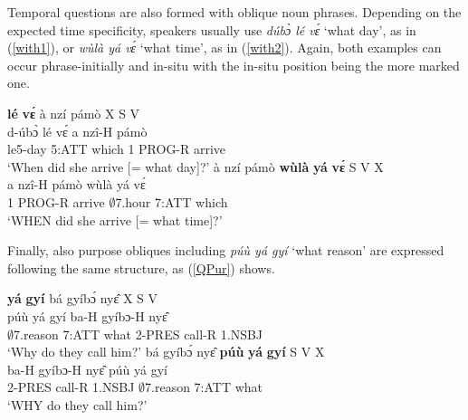 Temporal questions are also formed with oblique noun phrases. Depending on the expected time specificity, speakers usually use {\itshape dúbɔ̀ lé vɛ́} `what day', as in (\ref{with1}), or {\itshape wùlà yá vɛ́} `what time', as in (\ref{with2}). Again, both examples can occur phrase-initially and in-situ with the in-situ position being the more marked one.

\begin{exe}
\ex\label{with}
\begin{xlist}
\ex \label{with1}
   {\bfseries lé} {\bfseries vɛ́} à nzí pámò \hfill X S V\\
              d-úbɔ̀ lé vɛ́ a nzî-H pámò \\
               le5-day 5:ATT which 1 PROG-R arrive \\
    \trans `When did she arrive [= what day]?'
\ex\label{with2}
 \glll    à nzí pámò {\bfseries wùlà} {\bfseries yá} {\bfseries vɛ́}  \hfill S V X \\
             a nzî-H pámò  wùlà yá vɛ́ \\
             1 PROG-R arrive  $\emptyset$7.hour 7:ATT which  \\
    \trans `WHEN did she arrive [= what time]?'
\end {xlist}
\end {exe}

\noindent Finally, also purpose obliques including {\itshape púù yá gyí} `what reason' are expressed following the same structure, as (\ref{QPur}) shows.

\begin{exe}
\ex\label{QPur}
\begin{xlist}
\ex \label{QPura}
   {\bfseries yá} {\bfseries gyí} bá gyíbɔ́ nyɛ̂ \hfill  X S V\\
              púù yá gyí ba-H gyíbɔ-H nyɛ̂ \\
               $\emptyset$7.reason 7:ATT what 2-PRES call-R 1.NSBJ \\
    \trans `Why do they call him?'
\ex\label{QPurb}
  \glll       bá gyíbɔ́ nyɛ̂ {\bfseries púù} {\bfseries yá} {\bfseries gyí} \hfill S V X\\
               ba-H gyíbɔ-H nyɛ̂ púù yá gyí\\
                2-PRES call-R 1.NSBJ $\emptyset$7.reason 7:ATT what\\
    \trans `WHY do they call him?'
\end {xlist}
\end {exe}





